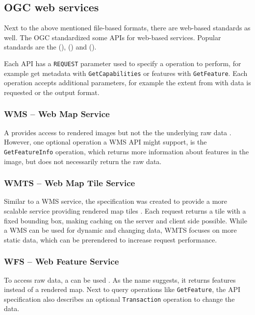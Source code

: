 	\subsection{OGC web services}
	
		Next to the above mentioned file-based formats, there are web-based standards as well.
		The OGC standardized some APIs for web-based services.
		Popular standards are the  (),  () and  ().
		
		Each API has a \texttt{REQUEST} parameter used to specify a operation to perform, for example get metadata with \texttt{GetCapabilities} or features with \texttt{GetFeature}.
		Each operation accepts additional parameters, for example the extent from with data is requested or the output format.
		
		\subsubsection{WMS -- Web Map Service}
		
			A  provides access to rendered images but not the the underlying raw data \cite{ogc-wms}.
			However, one optional operation a WMS API might support, is the \texttt{GetFeatureInfo} operation, which returns more information about features in the image, but does not necessarily return the raw data.
		
		\subsubsection{WMTS -- Web Map Tile Service}
		
			Similar to a WMS service, the  specification was created to provide a more scalable service providing rendered map tiles \cite{ogc-wmts}.
			Each request returns a tile with a fixed bounding box, making caching on the server and client side possible.
			While a WMS can be used for dynamic and changing data, WMTS focuses on more static data, which can be prerendered to increase request performance.
		
		\subsubsection{WFS -- Web Feature Service}
		
			To access raw data, a  can be used \cite{ogc-wfs}.
			As the name suggests, it returns features instead of a rendered map.
			Next to query operations like \texttt{GetFeature}, the API specification also describes an optional \texttt{Transaction} operation to change the data.
	
